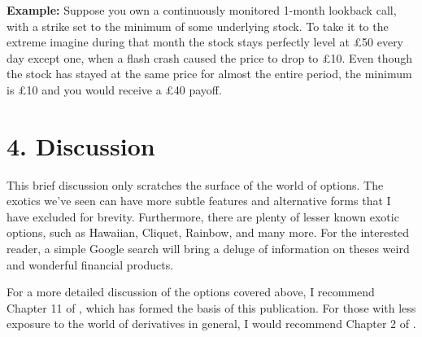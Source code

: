 \documentclass[11pt]{article}
\begin{document}
\textbf{Example:} Suppose you own a continuously monitored 1-month lookback call, with a strike set to the minimum of some underlying stock. To take it to the extreme imagine during that month the stock stays perfectly level at £50 every day except one, when a flash crash caused the price to drop to £10. Even though the stock has stayed at the same price for almost the entire period, the minimum is £10 and you would receive a £40 payoff. 

\section*{4. Discussion}
This brief discussion only scratches the surface of the world of options. The exotics we've seen can have more subtle features and alternative forms that I have excluded for brevity. Furthermore, there are plenty of lesser known exotic options, such as Hawaiian, Cliquet, Rainbow, and many more. For the interested reader, a simple Google search will bring a deluge of information on theses weird and wonderful financial products. 

For a more detailed discussion of the options covered above, I recommend Chapter 11 of \cite{quail2009financial}, which has formed the basis of this publication. For those with less exposure to the world of derivatives in general, I would recommend Chapter 2 of \cite{wilmott2013paul}.

 
 
\end{document}
